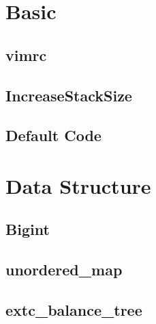 \documentclass[10pt,twocolumn,oneside]{article}
\begin{document}
\pagestyle{fancy}
\fancyfoot{}
\fancyhead[R]{\thepage}
\renewcommand{\headrulewidth}{0.4pt}
\renewcommand{\contentsname}{Contents} 

\scriptsize
\tableofcontents

\newpage

\section{Basic}
\subsection{vimrc}


\subsection{IncreaseStackSize}


\newpage

\subsection{Default Code}

\newpage

\section{Data Structure}
\subsection{Bigint}


% 

\subsection{unordered\_map}


\subsection{extc\_balance\_tree}

\end{document}
